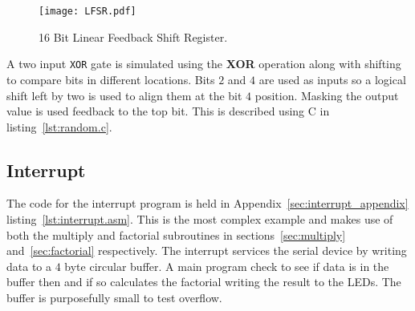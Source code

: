 \begin{figure}[ht]
   \centering
    \texttt{[image: LFSR.pdf]}
		\caption{16 Bit Linear Feedback Shift Register.}%
   \label{fig:lfsr}
\end{figure}

A two input \texttt{XOR} gate is simulated using the \textbf{XOR} operation along with shifting to compare bits in different locations.
Bits $2$ and $4$ are used as inputs so a logical shift left by two is used to align them at the bit $4$ position. 
Masking the output value is used feedback to the top bit.
This is described using C in listing~\ref{lst:random.c}. 

\begin{minipage}{\linewidth}

\end{minipage}




\subsection{Interrupt}
The code for the interrupt program is held in Appendix~\ref{sec:interrupt_appendix} listing~\ref{lst:interrupt.asm}.
This is the most complex example and makes use of both the multiply and factorial subroutines in sections~\ref{sec:multiply} and~\ref{sec:factorial} respectively.
The interrupt services the serial device by writing data to a $4$ byte circular buffer. 
A main program check to see if data is in the buffer then and if so calculates the factorial writing the result to the LEDs.
The buffer is purposefully small to test overflow.

\newpage




